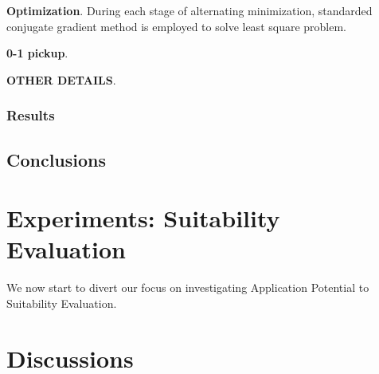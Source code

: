 \documentclass{article} %
\begin{document}
\textbf{Optimization}.
During each stage of alternating minimization, standarded conjugate gradient method is
employed to solve least square problem. 

\textbf{0-1 pickup}.

\textbf{OTHER DETAILS}.

\subsubsection{Results}


\subsection{Conclusions}



\section{Experiments: Suitability Evaluation}
We now start to divert our focus on investigating Application Potential to
Suitability Evaluation.

\section{Discussions}

{}

\end{document}
